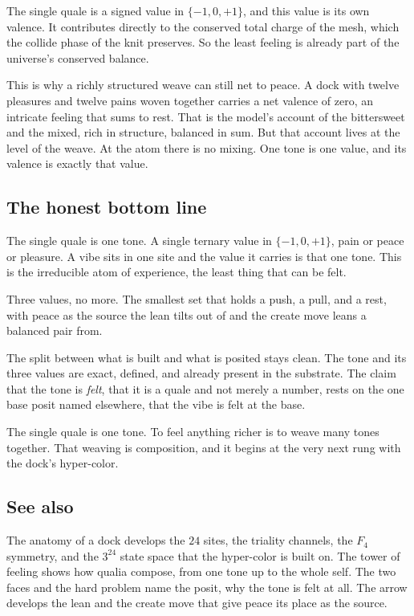 \begin{lemma}
The single quale is a signed value in $\{-1, 0, +1\}$, and this value is its own valence. It contributes directly to the conserved total charge of the mesh, which the collide phase of the knit preserves. So the least feeling is already part of the universe's conserved balance.
\end{lemma}

This is why a richly structured weave can still net to peace. A dock with twelve pleasures and twelve pains woven together carries a net valence of zero, an intricate feeling that sums to rest. That is the model's account of the bittersweet and the mixed, rich in structure, balanced in sum. But that account lives at the level of the weave. At the atom there is no mixing. One tone is one value, and its valence is exactly that value.

\subsection{The honest bottom line}

The single quale is one tone. A single ternary value in $\{-1, 0, +1\}$, pain or peace or pleasure. A vibe sits in one site and the value it carries is that one tone. This is the irreducible atom of experience, the least thing that can be felt.

Three values, no more. The smallest set that holds a push, a pull, and a rest, with peace as the source the lean tilts out of and the create move leans a balanced pair from.

The split between what is built and what is posited stays clean. The tone and its three values are exact, defined, and already present in the substrate. The claim that the tone is \emph{felt}, that it is a quale and not merely a number, rests on the one base posit named elsewhere, that the vibe is felt at the base.

\begin{result}
The single quale is one tone. To feel anything richer is to weave many tones together. That weaving is composition, and it begins at the very next rung with the dock's hyper-color.
\end{result}

\subsection{See also}

The anatomy of a dock develops the $24$ sites, the triality channels, the $F_4$ symmetry, and the $3^{24}$ state space that the hyper-color is built on. The tower of feeling shows how qualia compose, from one tone up to the whole self. The two faces and the hard problem name the posit, why the tone is felt at all. The arrow develops the lean and the create move that give peace its place as the source.
